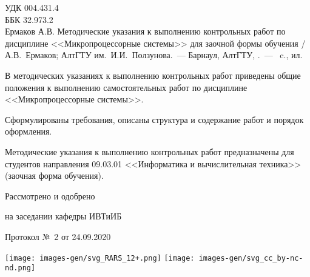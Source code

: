 \documentclass[main.tex]{subfiles}
\begin{document}
\thispagestyle{empty}
\noindent
УДК 004.431.4\\%
ББК 32.973.2\\%

Ермаков А.В. Методические указания к выполнению контрольных работ %
по дисциплине <<Микропроцессорные системы>> для заочной формы обучения / А.В.~Ермаков; АлтГТУ им.~И.И.~Ползунова.~--- Барнаул, АлтГТУ, \the\year.~--- \pageref{LastPage}~c., ил.



\vspace{24pt}

\begin{small}
В методических указаниях к выполнению контрольных работ приведены общие положения к выполнению самостоятельных работ по дисциплине <<Микропроцессорные системы>>.

Сформулированы требования, описаны структура и содержание работ и порядок оформления.%

Методические указания к выполнению контрольных работ предназначены для студентов направления 09.03.01 <<Информатика и вычислительная техника>> (заочная форма обучения).
\end{small}

\vfill

\begin{flushright}
Рассмотрено и одобрено

на заседании кафедры ИВТиИБ

Протокол №~2 от 24.09.2020
\end{flushright}

\vspace{96pt}







\noindent \texttt{[image: images-gen/svg\_RARS\_12+.png]} \hfill \texttt{[image: images-gen/svg\_cc\_by-nc-nd.png]}
\end{document}

